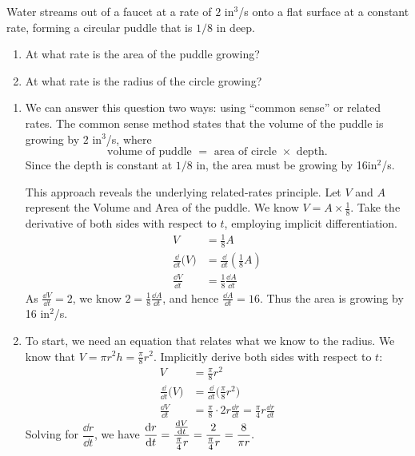 \begin{example}\label{ex_rr2}%
Water streams out of a faucet at a rate of $2$ in$^3$/s onto a flat surface at a constant rate, forming a circular puddle that is $1/8$ in deep. 
\begin{enumerate}
	\item	At what rate is the area of the puddle growing?
	\item	At what rate is the radius of the circle growing?
\end{enumerate}
\solution
\begin{enumerate}
\item We can answer this question two ways: using ``common sense'' or related rates. The common sense method states that the volume of the puddle is growing by $2$ in$^3$/s, where
\[\text{volume of puddle } = \text{ area of circle } \times \text{ depth.}\]
Since the depth is constant at $1/8$ in, the area must be growing by 16in$^2$/s.

This approach reveals the underlying related-rates principle. Let $V$ and $A$ represent the Volume and Area of the puddle. We know $V= A\times \frac18$. Take the derivative of both sides with respect to $t$, employing implicit differentiation.
\begin{align*}
V &= \frac18A\\
\frac{\dd}{\dd t}\bigl(V\bigr) &= \frac{\dd}{\dd t}\left(\frac18A\right)\\
\frac{\dd V}{\dd t} &= \frac18\frac{\dd A}{\dd t}
\end{align*} 
As $\frac{\dd V}{\dd t} = 2$, we know $2 = \frac18\frac{\dd A}{\dd t}$, and hence $\frac{\dd A}{\dd t} = 16$. Thus the area is growing by 16 in$^2$/s.

\item		To start, we need an equation that relates what we know to the radius.
We know that $V=\pi r^2h=\frac\pi8r^2$.  Implicitly derive both sides with respect to $t$:
\begin{align*}
 V &= \frac\pi8 r^2 \\
 \frac{\dd}{\dd t}\bigl(V\bigr) &= \frac{\dd}{\dd t}\bigl(\frac\pi8 r^2\bigr) \\
 \frac{\dd V}{\dd t} &= \frac\pi8\cdot2r\frac{\dd r}{\dd t}=\frac\pi4 r\frac{\dd r}{\dd t}
\end{align*}
Solving for $\dfrac{\dd r}{\dd t}$, we have
$\displaystyle
\frac{\operatorname{d}\! r}{\operatorname{d}\! t}=\frac{\frac{\operatorname{d}\! V}{\operatorname{d}\! t}}{\frac\pi4 r}
=\frac{2}{\frac\pi4 r}=\frac8{\pi r}.
$
%
%


\end{enumerate}
\end{example}
